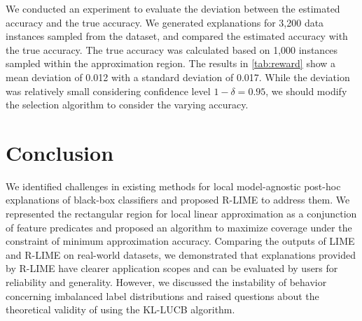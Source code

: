 \documentclass[runningheads]{llncs}
\begin{document}
We conducted an experiment to evaluate the deviation
between the estimated accuracy and the true accuracy.
We generated explanations for 3,200 data instances sampled from the dataset,
and compared the estimated accuracy with the true accuracy.
The true accuracy was calculated based on 1,000 instances sampled
within the approximation region.
The results in \cref{tab:reward} show a mean deviation of 0.012
with a standard deviation of 0.017.
While the deviation was relatively small considering confidence level $1-\delta=0.95$,
we should modify the selection algorithm to consider the varying accuracy.

% 

\section{Conclusion}
We identified challenges in existing methods for local model-agnostic post-hoc
explanations of black-box classifiers and proposed R-LIME to address them.
We represented the rectangular region for local linear approximation as a
conjunction of feature predicates and proposed an algorithm to
maximize coverage under the constraint of minimum approximation accuracy.
Comparing the outputs of LIME and R-LIME on real-world datasets,
we demonstrated that explanations provided by R-LIME have clearer application
scopes and can be evaluated by users for reliability and generality.
However, we discussed the instability of behavior concerning imbalanced label
distributions and raised questions about the theoretical validity of using
the KL-LUCB algorithm.
\end{document}
